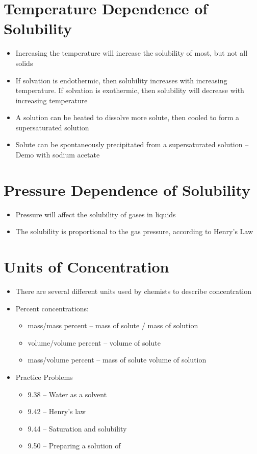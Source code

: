 \documentclass[12pt, openany, letterpaper]{memoir}
\begin{document}
\section{Temperature Dependence of Solubility}
\begin{itemize}
	\item Increasing the temperature will increase the solubility of most, but not all solids
	\item If solvation is endothermic, then solubility increases with increasing temperature. If solvation is exothermic, then solubility will decrease with increasing temperature
	\item A solution can be heated to dissolve more solute, then cooled to form a supersaturated solution
	\item Solute can be spontaneously precipitated from a supersaturated solution -- Demo with sodium acetate
\end{itemize}
\section{Pressure Dependence of Solubility}
\begin{itemize}
	\item Pressure will affect the solubility of gases in liquids
	\item The solubility is proportional to the gas pressure, according to Henry's Law
\end{itemize}
\section{Units of Concentration}
\begin{itemize}
	\item There are several different units used by chemists to describe concentration
	\item Percent concentrations:
	\begin{itemize}
		\item mass/mass percent -- mass of solute / mass of solution
		\item volume/volume percent -- volume of solute
		\item mass/volume percent -- mass of solute volume of solution
	\end{itemize}
	\item Practice Problems
	\begin{itemize}
		\item 9.38 -- Water as a solvent
		\item 9.42 -- Henry's law
		\item 9.44 -- Saturation and solubility
		\item 9.50 -- Preparing a solution of  
	\end{itemize}
\end{itemize}
\end{document}
